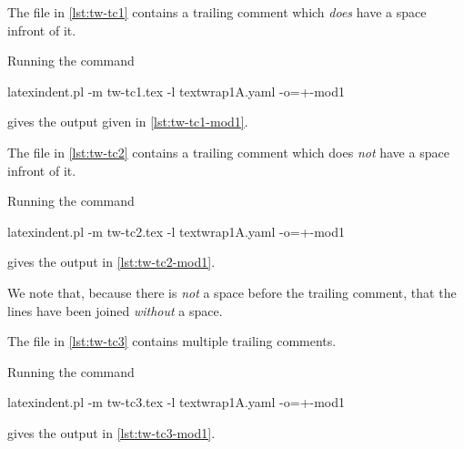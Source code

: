  \begin{example}
  The file in \cref{lst:tw-tc1} contains a trailing comment which \emph{does} have a space
  infront of it.

  Running the command
  \begin{commandshell}
latexindent.pl -m tw-tc1.tex -l textwrap1A.yaml -o=+-mod1 
\end{commandshell}
  gives the output given in \cref{lst:tw-tc1-mod1}.

  \begin{cmhtcbraster}[raster column skip=.1\linewidth]
  \end{cmhtcbraster}
 \end{example}

 \begin{example}
  The file in \cref{lst:tw-tc2} contains a trailing comment which does \emph{not} have a
  space infront of it.

  Running the command
  \begin{commandshell}
latexindent.pl -m tw-tc2.tex -l textwrap1A.yaml -o=+-mod1 
\end{commandshell}
  gives the output in \cref{lst:tw-tc2-mod1}.
  \begin{cmhtcbraster}[raster column skip=.1\linewidth]
  \end{cmhtcbraster}
  We note that, because there is \emph{not} a space before the trailing comment, that the
  lines have been joined \emph{without} a space.
 \end{example}

 \begin{example}
  The file in \cref{lst:tw-tc3} contains multiple trailing comments.

  Running the command
  \begin{commandshell}
latexindent.pl -m tw-tc3.tex -l textwrap1A.yaml -o=+-mod1 
\end{commandshell}
  gives the output in \cref{lst:tw-tc3-mod1}.
  \begin{cmhtcbraster}[raster column skip=.1\linewidth]
  \end{cmhtcbraster}
 \end{example}

